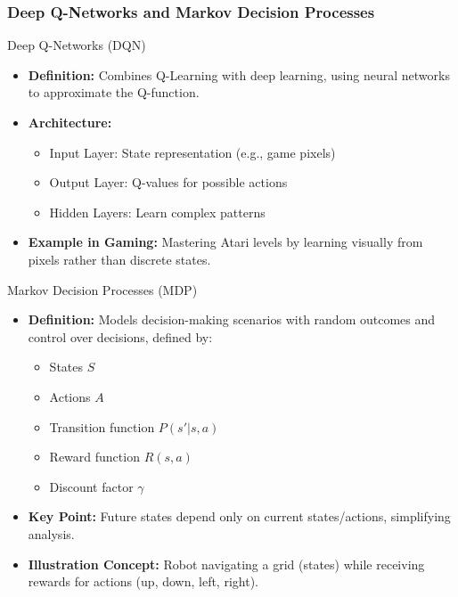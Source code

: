 \documentclass[aspectratio=169]{beamer}
\begin{document}
\begin{frame}[fragile]
    \frametitle{Deep Q-Networks and Markov Decision Processes}
    \begin{block}{Deep Q-Networks (DQN)}
        \begin{itemize}
            \item \textbf{Definition:} Combines Q-Learning with deep learning, using neural networks to approximate the Q-function.
            \item \textbf{Architecture:}
            \begin{itemize}
                \item Input Layer: State representation (e.g., game pixels)
                \item Output Layer: Q-values for possible actions
                \item Hidden Layers: Learn complex patterns
            \end{itemize}
            \item \textbf{Example in Gaming:} Mastering Atari levels by learning visually from pixels rather than discrete states.
        \end{itemize}
    \end{block}

    \begin{block}{Markov Decision Processes (MDP)}
        \begin{itemize}
            \item \textbf{Definition:} Models decision-making scenarios with random outcomes and control over decisions, defined by:
            \begin{itemize}
                \item States $S$
                \item Actions $A$
                \item Transition function $P(s' | s, a)$
                \item Reward function $R(s, a)$
                \item Discount factor $\gamma$
            \end{itemize}
            \item \textbf{Key Point:} Future states depend only on current states/actions, simplifying analysis.
            \item \textbf{Illustration Concept:} Robot navigating a grid (states) while receiving rewards for actions (up, down, left, right).
        \end{itemize}
    \end{block}
\end{frame}
\end{document}
